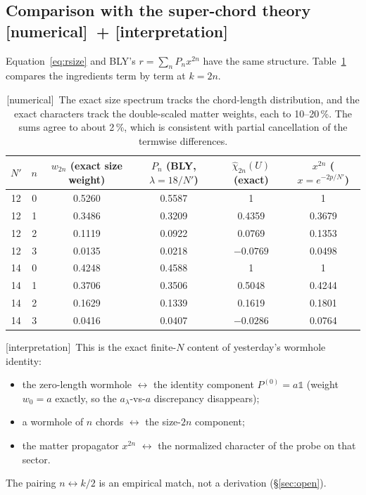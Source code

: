 \documentclass[11pt]{article}
\newcommand{\Np}{N'}
\newcommand{\one}{\mathds 1}
\newcommand{\tagbox}[2]{\textsf{\small\color{#1}[#2]}}
\newcommand{\NUM}{\tagbox{cnum}{numerical}}
\newcommand{\INTERP}{\tagbox{cconj}{interpretation}}
\theoremstyle{remark}
\begin{document}
\subsection{Comparison with the super-chord theory \NUM\ + \INTERP}\label{sec:chordcomp}
Equation~\eqref{eq:rsize} and BLY's $r=\sum_nP_nx^{2n}$ have the same structure. Table~\ref{tab:chordcomp} compares the
ingredients term by term at $k=2n$.
\begin{table}[h]
\centering\small
\begin{tabular}{@{}cc cc cc@{}}
\toprule
$\Np$ & $n$ & $w_{2n}$ (exact size weight) & $P_n$ (BLY, $\lambda=18/\Np$) & $\hat\chi_{2n}(U)$ (exact) & $x^{2n}$ ($x=e^{-2p/\Np}$)\\
\midrule
12 & 0 & 0.5260 & 0.5587 & 1 & 1\\
12 & 1 & 0.3486 & 0.3209 & 0.4359 & 0.3679\\
12 & 2 & 0.1119 & 0.0922 & 0.0769 & 0.1353\\
12 & 3 & 0.0135 & 0.0218 & $-0.0769$ & 0.0498\\
\midrule
14 & 0 & 0.4248 & 0.4588 & 1 & 1\\
14 & 1 & 0.3706 & 0.3506 & 0.5048 & 0.4244\\
14 & 2 & 0.1629 & 0.1339 & 0.1619 & 0.1801\\
14 & 3 & 0.0416 & 0.0407 & $-0.0286$ & 0.0764\\
\bottomrule
\end{tabular}
\caption{\NUM\ The exact size spectrum tracks the chord-length distribution, and the exact characters track the
double-scaled matter weights, each to 10--20\,\%. The sums agree to about 2\,\%, which is consistent with partial
cancellation of the termwise differences.}
\label{tab:chordcomp}
\end{table}

\INTERP\ This is the exact finite-$N$ content of yesterday's wormhole identity:
\begin{itemize}\itemsep1pt
\item the zero-length wormhole $\leftrightarrow$ the identity component $P^{(0)}=a\one$ (weight $w_0=a$ exactly, so the
  $a_\lambda$-vs-$a$ discrepancy disappears);
\item a wormhole of $n$ chords $\leftrightarrow$ the size-$2n$ component;
\item the matter propagator $x^{2n}$ $\leftrightarrow$ the normalized character of the probe on that sector.
\end{itemize}
The pairing $n\leftrightarrow k/2$ is an empirical match, not a derivation (\S\ref{sec:open}).
\end{document}
